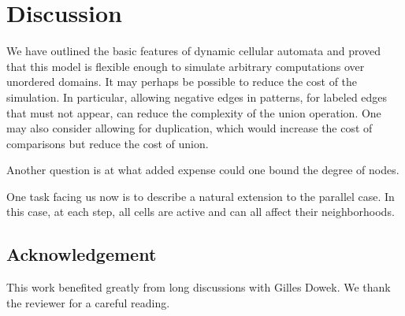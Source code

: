 \documentclass[submission,copyright,creativecommons,english]{eptcs}
\begin{document}
\section{Discussion}

We have outlined the basic features of dynamic cellular automata and proved that this model is flexible enough
to simulate arbitrary computations over unordered domains.
It may perhaps be possible to reduce the cost of the simulation.
{In particular, allowing negative edges in patterns, for labeled edges that must not appear, can reduce the complexity of the union operation.
One may also consider allowing for duplication, which would increase the cost of comparisons but reduce the cost of union.}

{Another question is at what added expense could one  bound the degree of nodes.}

One task facing us now is to describe a natural extension to the parallel case. In this case, at each step, all  cells are active and can all affect their neighborhoods.

\subsection*{Acknowledgement}
This work benefited greatly from long discussions with Gilles Dowek.
{We thank the reviewer for a careful reading.}



 
\end{document}
